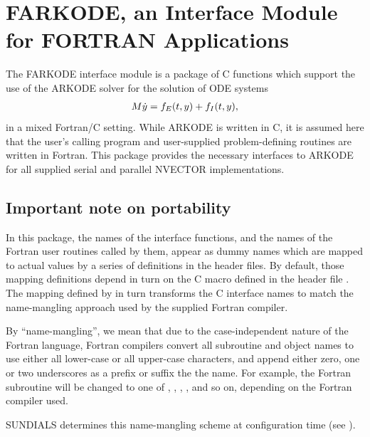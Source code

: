 \documentclass[letterpaper,10pt,english]{sphinxmanual}
\begin{document}
\chapter{FARKODE, an Interface Module for FORTRAN Applications}
\label{f_interface/index:farkode-an-interface-module-for-fortran-applications}\label{f_interface/index:fortraninterface}\label{f_interface/index::doc}
The FARKODE interface module is a package of C functions which
support the use of the ARKODE solver for the solution of ODE
systems
\begin{gather}
\begin{split}M \dot{y} = f_E(t,y) + f_I(t,y),\end{split}\notag
\end{gather}
in a mixed Fortran/C setting.  While ARKODE is written in C, it is
assumed here that the user's calling program and user-supplied
problem-defining routines are written in Fortran. This package
provides the necessary interfaces to ARKODE for all supplied serial
and parallel NVECTOR implementations.


\section{Important note on portability}
\label{f_interface/index:important-note-on-portability}\label{f_interface/index:finterface-portability}
In this package, the names of the interface functions, and the names
of the Fortran user routines called by them, appear as dummy names
which are mapped to actual values by a series of definitions in the
header files.  By default, those mapping definitions depend in turn
on the C macro  defined in the header file
.  The mapping defined by  in turn
transforms the C interface names to match the name-mangling approach
used by the supplied Fortran compiler.

By ``name-mangling'', we mean that due to the case-independent nature of
the Fortran language, Fortran compilers convert all subroutine and
object names to use either all lower-case or all upper-case
characters, and append either zero, one or two underscores as a prefix
or suffix the the name.  For example, the Fortran subroutine
 will be changed to one of ,
, , , and so on,
depending on the Fortran compiler used.

SUNDIALS determines this name-mangling scheme at configuration time
(see {\hyperref[Install:installation]{\emph{}}}).
\end{document}
